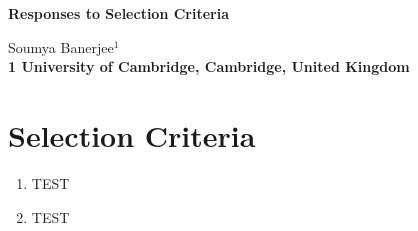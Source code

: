 \documentclass[10pt]{article}
\date{}
\begin{document}
\begin{flushleft}
{\Large
\textbf{Responses to Selection Criteria}
}



Soumya Banerjee$^{1}$
\\
\bf{1} University of Cambridge, Cambridge, United Kingdom
\\
\end{flushleft}

\section*{Selection Criteria}





\begin{enumerate}

\item TEST

\item TEST

\end{enumerate}
\end{document}
